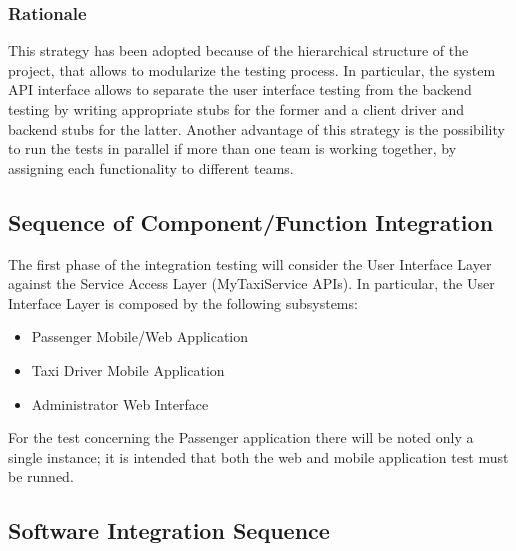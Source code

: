 \documentclass[11pt, a4paper,titlepage]{article}
\begin{document}
	\subsubsection{Rationale}
	This strategy has been adopted because of the hierarchical structure of the project, that allows to modularize the testing process. In particular, the system API interface allows to separate the user interface testing from the backend testing by writing appropriate stubs for the former and a client driver and backend stubs for the latter.
	Another advantage of this strategy is the possibility to run the tests in parallel if more than one team is working together, by assigning each functionality to different teams.
	
	\newpage
	\subsection{Sequence of Component/Function Integration}
	The first phase of the integration testing will consider the User Interface Layer against the Service Access Layer (MyTaxiService APIs).
	In particular, the User Interface Layer is composed by the following subsystems:
	\begin{itemize}
		\item Passenger Mobile/Web Application
		\item Taxi Driver Mobile Application
		\item Administrator Web Interface
	\end{itemize}
	For the test concerning the Passenger application there will be noted only a single instance; it is intended that both the web and mobile application test must be runned.
	\newpage
	\subsection{Software Integration Sequence}
\end{document}

